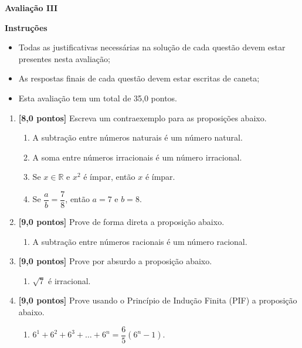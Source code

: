 \documentclass[12pt,a4paper]{article}
\begin{document}
\begin{center}
 \textbf{Avaliação III}
\end{center}

\textbf{Instruções}
\begin{itemize}
 \item Todas as justificativas necessárias na solução de cada questão devem 
 estar presentes nesta avaliação;
 \item As respostas finais de cada questão devem estar escritas de caneta;
 \item Esta avaliação tem um total de 35,0 pontos.
\end{itemize}

\begin{enumerate}
  \item \textbf{[8,0 pontos]} Escreva um contraexemplo para as proposições abaixo.
  \begin{enumerate}
    \item A subtração entre números naturais é um número natural.
    \item A soma entre números irracionais é um número irracional.
    \item Se $x\in\mathbb{R}$ e $x^2$ é ímpar, então $x$ é ímpar.
    \item Se $\dfrac{a}{b} = \dfrac{7}{8}$, então $a = 7$ e $b = 8$.
  \end{enumerate}
  
  \item \textbf{[9,0 pontos]} Prove de forma direta a proposição abaixo.
  \begin{enumerate}
    \item A subtração entre números racionais é um número racional.
  \end{enumerate}
  
  \item \textbf{[9,0 pontos]} Prove por absurdo a proposição abaixo.
  \begin{enumerate}
    \item $\sqrt{7}$ é irracional.
  \end{enumerate}

  \item \textbf{[9,0 pontos]} Prove usando o Princípio de Indução Finita (PIF) a proposição abaixo.
  \begin{enumerate}
    \item $6^1 + 6^2 + 6^3 + \ldots + 6^n = \dfrac{6}{5}\left(6^{n} - 1\right)$.
  \end{enumerate}
  
\end{enumerate}
\end{document}
